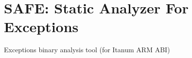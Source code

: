 \chapter{SAFE\+: Static Analyzer For Exceptions}
\hypertarget{md__2home_2mchan_2Senior__Project_2exception-insights_2README}{}\label{md__2home_2mchan_2Senior__Project_2exception-insights_2README}
\label{md__2home_2mchan_2Senior__Project_2exception-insights_2README_autotoc_md0}%
%
Exceptions binary analysis tool (for Itanum ARM ABI) 